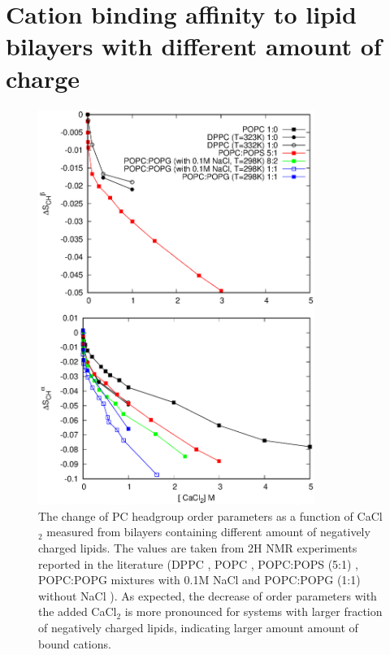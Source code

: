 \documentclass[aps,prl,superscriptaddress,twocolumn]{revtex4}
\begin{document}
\section{Cation binding affinity to lipid bilayers with different amount of charge}

\begin{figure}[]
  \centering
  \includegraphics[width=9.0cm]{../Figs/CHANGESwithCaCl.eps}
  \caption{\label{OrderParameterCHANGESWithCaClBELOW1M}
    The change of PC headgroup order parameters as a function of CaCl$_2$
    measured from bilayers containing different amount of negatively charged lipids.
    The values are taken from 2H NMR experiments reported in the
    literature (DPPC \cite{akutsu81}, POPC \cite{altenbach84}, POPC:POPS (5:1) \cite{roux90},
    POPC:POPG  mixtures with 0.1M NaCl \cite{macdonald87}
    and POPC:POPG (1:1) without NaCl \cite{borle85}).
    As expected, the decrease of order parameters with the added CaCl$_2$
    is more pronounced for systems with larger fraction of
    negatively charged lipids, indicating larger amount amount
    of bound cations.
  }
\end{figure}
\end{document}
